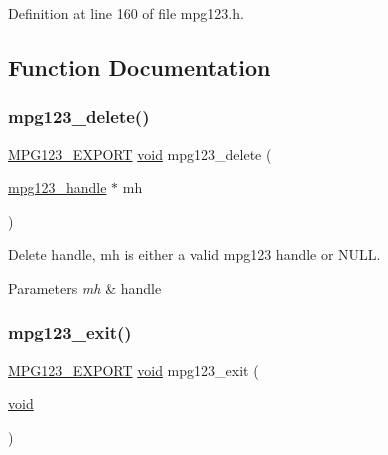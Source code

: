 Definition at line 160 of file mpg123.\+h.



\subsection{Function Documentation}
\mbox{\label{group__mpg123__init_ga1607278690c3dea7affb906615af12ad}} 
\subsubsection{\texorpdfstring{mpg123\_delete()}{mpg123\_delete()}}
{\footnotesize\ttfamily \mbox{\hyperlink{mpg123_8h_a2ba98cfba3f760879df70e755b2a61cc}{M\+P\+G123\+\_\+\+E\+X\+P\+O\+RT}} \mbox{\hyperlink{_s_d_l__opengles2__gl2ext_8h_ae5d8fa23ad07c48bb609509eae494c95}{void}} mpg123\+\_\+delete (\begin{DoxyParamCaption}\item[{\mbox{\hyperlink{group__mpg123__init_ga6728e2839a395f3a07d4514da659faca}{mpg123\+\_\+handle}} $\ast$}]{mh }\end{DoxyParamCaption})}

Delete handle, mh is either a valid mpg123 handle or N\+U\+LL. 
\begin{DoxyParams}{Parameters}
{\em mh} & handle \\
\hline
\end{DoxyParams}
\mbox{\label{group__mpg123__init_gac73c78104d6525100aa4e1c62705c6be}} 
\subsubsection{\texorpdfstring{mpg123\_exit()}{mpg123\_exit()}}
{\footnotesize\ttfamily \mbox{\hyperlink{mpg123_8h_a2ba98cfba3f760879df70e755b2a61cc}{M\+P\+G123\+\_\+\+E\+X\+P\+O\+RT}} \mbox{\hyperlink{_s_d_l__opengles2__gl2ext_8h_ae5d8fa23ad07c48bb609509eae494c95}{void}} mpg123\+\_\+exit (\begin{DoxyParamCaption}\item[{\mbox{\hyperlink{_s_d_l__opengles2__gl2ext_8h_ae5d8fa23ad07c48bb609509eae494c95}{void}}}]{ }\end{DoxyParamCaption})}

